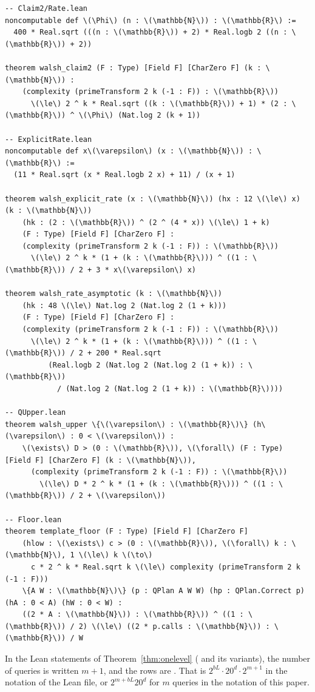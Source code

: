 \documentclass[acmsmall,nonacm,screen]{acmart}
\newcommand{\lean}[1]{\textup{\texttt{\detokenize{#1}}}}
\begin{document}
\begin{Verbatim}[commandchars=\\\{\},fontsize=\small]
-- Claim2/Rate.lean
noncomputable def \(\Phi\) (n : \(\mathbb{N}\)) : \(\mathbb{R}\) :=
  400 * Real.sqrt (((n : \(\mathbb{R}\)) + 2) * Real.logb 2 ((n : \(\mathbb{R}\)) + 2))

theorem walsh_claim2 (F : Type) [Field F] [CharZero F] (k : \(\mathbb{N}\)) :
    (complexity (primeTransform 2 k (-1 : F)) : \(\mathbb{R}\))
      \(\le\) 2 ^ k * Real.sqrt ((k : \(\mathbb{R}\)) + 1) * (2 : \(\mathbb{R}\)) ^ \(\Phi\) (Nat.log 2 (k + 1))

-- ExplicitRate.lean
noncomputable def x\(\varepsilon\) (x : \(\mathbb{N}\)) : \(\mathbb{R}\) :=
  (11 * Real.sqrt (x * Real.logb 2 x) + 11) / (x + 1)

theorem walsh_explicit_rate (x : \(\mathbb{N}\)) (hx : 12 \(\le\) x) (k : \(\mathbb{N}\))
    (hk : (2 : \(\mathbb{R}\)) ^ (2 ^ (4 * x)) \(\le\) 1 + k)
    (F : Type) [Field F] [CharZero F] :
    (complexity (primeTransform 2 k (-1 : F)) : \(\mathbb{R}\))
      \(\le\) 2 ^ k * (1 + (k : \(\mathbb{R}\))) ^ ((1 : \(\mathbb{R}\)) / 2 + 3 * x\(\varepsilon\) x)

theorem walsh_rate_asymptotic (k : \(\mathbb{N}\))
    (hk : 48 \(\le\) Nat.log 2 (Nat.log 2 (1 + k)))
    (F : Type) [Field F] [CharZero F] :
    (complexity (primeTransform 2 k (-1 : F)) : \(\mathbb{R}\))
      \(\le\) 2 ^ k * (1 + (k : \(\mathbb{R}\))) ^ ((1 : \(\mathbb{R}\)) / 2 + 200 * Real.sqrt
          (Real.logb 2 (Nat.log 2 (Nat.log 2 (1 + k)) : \(\mathbb{R}\))
            / (Nat.log 2 (Nat.log 2 (1 + k)) : \(\mathbb{R}\))))

-- QUpper.lean
theorem walsh_upper \{\(\varepsilon\) : \(\mathbb{R}\)\} (h\(\varepsilon\) : 0 < \(\varepsilon\)) :
    \(\exists\) D > (0 : \(\mathbb{R}\)), \(\forall\) (F : Type) [Field F] [CharZero F] (k : \(\mathbb{N}\)),
      (complexity (primeTransform 2 k (-1 : F)) : \(\mathbb{R}\))
        \(\le\) D * 2 ^ k * (1 + (k : \(\mathbb{R}\))) ^ ((1 : \(\mathbb{R}\)) / 2 + \(\varepsilon\))

-- Floor.lean
theorem template_floor (F : Type) [Field F] [CharZero F]
    (hlow : \(\exists\) c > (0 : \(\mathbb{R}\)), \(\forall\) k : \(\mathbb{N}\), 1 \(\le\) k \(\to\)
      c * 2 ^ k * Real.sqrt k \(\le\) complexity (primeTransform 2 k (-1 : F)))
    \{A W : \(\mathbb{N}\)\} (p : QPlan A W W) (hp : QPlan.Correct p) (hA : 0 < A) (hW : 0 < W) :
    ((2 * A : \(\mathbb{N}\)) : \(\mathbb{R}\)) ^ ((1 : \(\mathbb{R}\)) / 2) \(\le\) ((2 * p.calls : \(\mathbb{N}\)) : \(\mathbb{R}\)) / W
\end{Verbatim}

In the Lean statements of Theorem~\ref{thm:onelevel} (\lean{theorem1} and its variants), the number of queries is written $m+1$, and the rows are \lean{rows L b m (20 ^ d)}. That is $2^{bL}\cdot20^d\cdot2^{m+1}$ in the notation of the Lean file, or $2^{m+bL}20^d$ for $m$ queries in the notation of this paper.
\end{document}

